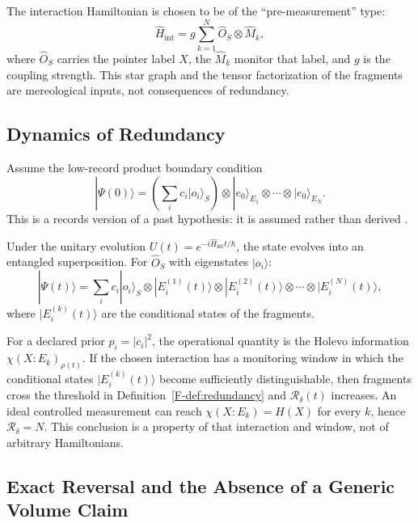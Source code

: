 \documentclass[12pt,a4paper,openany]{book}
\begin{document}
The interaction Hamiltonian is chosen to be of the ``pre-measurement'' type:
\begin{equation}
\hat{H}_{\text{int}} = g \sum_{k=1}^{N} \hat{O}_S \otimes \hat{M}_k,
\end{equation}
where $\hat{O}_S$ carries the pointer label $X$, the $\hat{M}_k$ monitor that label, and $g$ is the coupling strength.  This star graph and the tensor factorization of the fragments are mereological inputs, not consequences of redundancy.

\subsection{Dynamics of Redundancy}

Assume the low-record product boundary condition
\begin{equation}
|\Psi(0)\rangle = \left(\sum_i c_i|o_i\rangle_S\right)
\otimes |e_0\rangle_{E_1}\otimes\cdots\otimes|e_0\rangle_{E_N}.
\end{equation}
This is a records version of a past hypothesis: it is assumed rather than derived \cite{Albert2000,Wallace2010}.

Under the unitary evolution $U(t) = e^{-i\hat{H}_{\text{int}}t/\hbar}$, the state evolves into an entangled superposition. For $\hat{O}_S$ with eigenstates $|o_i\rangle$:
\begin{equation}
|\Psi(t)\rangle = \sum_i c_i |o_i\rangle_S \otimes |E_i^{(1)}(t)\rangle \otimes |E_i^{(2)}(t)\rangle \otimes \cdots \otimes |E_i^{(N)}(t)\rangle,
\end{equation}
where $|E_i^{(k)}(t)\rangle$ are the conditional states of the fragments.

For a declared prior $p_i=|c_i|^2$, the operational quantity is the Holevo information $\chi(X:E_k)_{\rho(t)}$.  If the chosen interaction has a monitoring window in which the conditional states $|E_i^{(k)}(t)\rangle$ become sufficiently distinguishable, then fragments cross the threshold in Definition~\ref{F-def:redundancy} and $\mathcal R_\delta(t)$ increases.  An ideal controlled measurement can reach $\chi(X:E_k)=H(X)$ for every $k$, hence $\mathcal R_\delta=N$.  This conclusion is a property of that interaction and window, not of arbitrary Hamiltonians.

\subsection{Exact Reversal and the Absence of a Generic Volume Claim}
\end{document}

